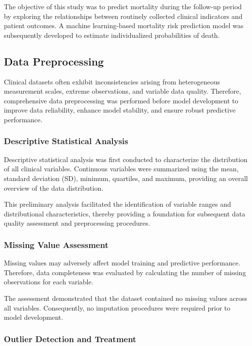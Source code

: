 \documentclass[12pt]{article}
\begin{document}
The objective of this study was to predict mortality during the follow-up period by exploring the relationships between routinely collected clinical indicators and patient outcomes. A machine learning-based mortality risk prediction model was subsequently developed to estimate individualized probabilities of death. 

\subsection{Data Preprocessing}

Clinical datasets often exhibit inconsistencies arising from heterogeneous measurement scales, extreme observations, and variable data quality. Therefore, comprehensive data preprocessing was performed before model development to improve data reliability, enhance model stability, and ensure robust predictive performance.

\subsubsection{Descriptive Statistical Analysis}

Descriptive statistical analysis was first conducted to characterize the distribution of all clinical variables. Continuous variables were summarized using the mean, standard deviation (SD), minimum, quartiles, and maximum, providing an overall overview of the data distribution.

This preliminary analysis facilitated the identification of variable ranges and distributional characteristics, thereby providing a foundation for subsequent data quality assessment and preprocessing procedures. 

\subsubsection{Missing Value Assessment}

Missing values may adversely affect model training and predictive performance. Therefore, data completeness was evaluated by calculating the number of missing observations for each variable.

The assessment demonstrated that the dataset contained no missing values across all variables. Consequently, no imputation procedures were required prior to model development. 

\subsubsection{Outlier Detection and Treatment}
\end{document}
